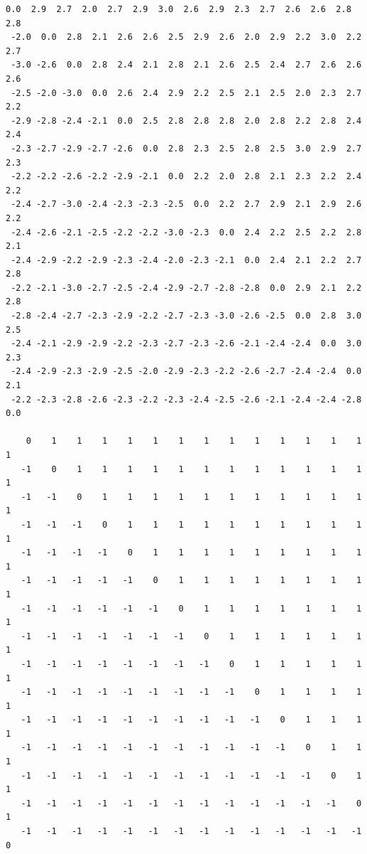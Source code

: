 \begin{verbatim}
0.0  2.9  2.7  2.0  2.7  2.9  3.0  2.6  2.9  2.3  2.7  2.6  2.6  2.8  2.8
 -2.0  0.0  2.8  2.1  2.6  2.6  2.5  2.9  2.6  2.0  2.9  2.2  3.0  2.2  2.7
 -3.0 -2.6  0.0  2.8  2.4  2.1  2.8  2.1  2.6  2.5  2.4  2.7  2.6  2.6  2.6
 -2.5 -2.0 -3.0  0.0  2.6  2.4  2.9  2.2  2.5  2.1  2.5  2.0  2.3  2.7  2.2
 -2.9 -2.8 -2.4 -2.1  0.0  2.5  2.8  2.8  2.8  2.0  2.8  2.2  2.8  2.4  2.4
 -2.3 -2.7 -2.9 -2.7 -2.6  0.0  2.8  2.3  2.5  2.8  2.5  3.0  2.9  2.7  2.3
 -2.2 -2.2 -2.6 -2.2 -2.9 -2.1  0.0  2.2  2.0  2.8  2.1  2.3  2.2  2.4  2.2
 -2.4 -2.7 -3.0 -2.4 -2.3 -2.3 -2.5  0.0  2.2  2.7  2.9  2.1  2.9  2.6  2.2
 -2.4 -2.6 -2.1 -2.5 -2.2 -2.2 -3.0 -2.3  0.0  2.4  2.2  2.5  2.2  2.8  2.1
 -2.4 -2.9 -2.2 -2.9 -2.3 -2.4 -2.0 -2.3 -2.1  0.0  2.4  2.1  2.2  2.7  2.8
 -2.2 -2.1 -3.0 -2.7 -2.5 -2.4 -2.9 -2.7 -2.8 -2.8  0.0  2.9  2.1  2.2  2.8
 -2.8 -2.4 -2.7 -2.3 -2.9 -2.2 -2.7 -2.3 -3.0 -2.6 -2.5  0.0  2.8  3.0  2.5
 -2.4 -2.1 -2.9 -2.9 -2.2 -2.3 -2.7 -2.3 -2.6 -2.1 -2.4 -2.4  0.0  3.0  2.3
 -2.4 -2.9 -2.3 -2.9 -2.5 -2.0 -2.9 -2.3 -2.2 -2.6 -2.7 -2.4 -2.4  0.0  2.1
 -2.2 -2.3 -2.8 -2.6 -2.3 -2.2 -2.3 -2.4 -2.5 -2.6 -2.1 -2.4 -2.4 -2.8  0.0

    0    1    1    1    1    1    1    1    1    1    1    1    1    1    1
   -1    0    1    1    1    1    1    1    1    1    1    1    1    1    1
   -1   -1    0    1    1    1    1    1    1    1    1    1    1    1    1
   -1   -1   -1    0    1    1    1    1    1    1    1    1    1    1    1
   -1   -1   -1   -1    0    1    1    1    1    1    1    1    1    1    1
   -1   -1   -1   -1   -1    0    1    1    1    1    1    1    1    1    1
   -1   -1   -1   -1   -1   -1    0    1    1    1    1    1    1    1    1
   -1   -1   -1   -1   -1   -1   -1    0    1    1    1    1    1    1    1
   -1   -1   -1   -1   -1   -1   -1   -1    0    1    1    1    1    1    1
   -1   -1   -1   -1   -1   -1   -1   -1   -1    0    1    1    1    1    1
   -1   -1   -1   -1   -1   -1   -1   -1   -1   -1    0    1    1    1    1
   -1   -1   -1   -1   -1   -1   -1   -1   -1   -1   -1    0    1    1    1
   -1   -1   -1   -1   -1   -1   -1   -1   -1   -1   -1   -1    0    1    1
   -1   -1   -1   -1   -1   -1   -1   -1   -1   -1   -1   -1   -1    0    1
   -1   -1   -1   -1   -1   -1   -1   -1   -1   -1   -1   -1   -1   -1    0
\end{verbatim}